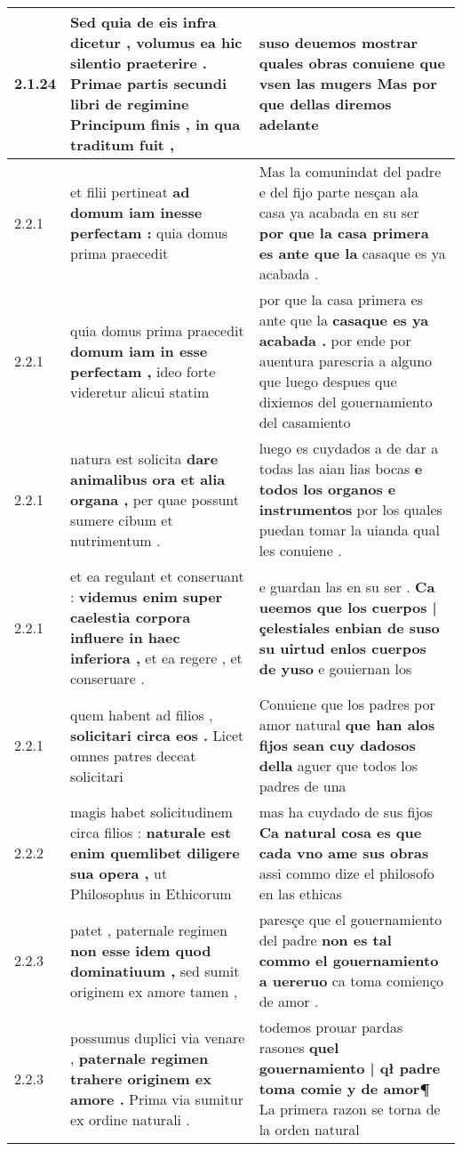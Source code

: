\begin{tabular}{|p{1cm}|p{6.5cm}|p{6.5cm}|}
2.1.24 & Sed quia de eis infra dicetur , \textbf{ volumus ea hic silentio praeterire . Primae partis secundi libri de regimine Principum finis , } in qua traditum fuit , & suso deuemos mostrar \textbf{ quales obras conuiene que vsen las mugers } Mas por que dellas diremos adelante \\\hline
2.2.1 & et filii pertineat \textbf{ ad domum iam inesse perfectam : } quia domus prima praecedit & Mas la comunindat del padre e del fijo parte nesçan ala casa ya acabada en su ser \textbf{ por que la casa primera es ante que la } casaque es ya acabada . \\\hline
2.2.1 & quia domus prima praecedit \textbf{ domum iam in esse perfectam , } ideo forte videretur alicui statim & por que la casa primera es ante que la \textbf{ casaque es ya acabada . } por ende por auentura parescria a alguno que luego despues que dixiemos del gouernamiento del casamiento \\\hline
2.2.1 & natura est solicita \textbf{ dare animalibus ora et alia organa , } per quae possunt sumere cibum et nutrimentum . & luego es cuydados a de dar a todas las aian lias bocas \textbf{ e todos los organos e instrumentos } por los quales puedan tomar la uianda qual les conuiene . \\\hline
2.2.1 & et ea regulant et conseruant : \textbf{ videmus enim super caelestia corpora influere in haec inferiora , } et ea regere , et conseruare . & e guardan las en su ser . \textbf{ Ca ueemos que los cuerpos | çelestiales enbian de suso su uirtud enlos cuerpos de yuso } e gouiernan los \\\hline
2.2.1 & quem habent ad filios , \textbf{ solicitari circa eos . } Licet omnes patres deceat solicitari & Conuiene que los padres por amor natural \textbf{ que han alos fijos sean cuy dadosos della } aguer que todos los padres de una \\\hline
2.2.2 & magis habet solicitudinem circa filios : \textbf{ naturale est enim quemlibet diligere sua opera , } ut Philosophus in Ethicorum & mas ha cuydado de sus fijos \textbf{ Ca natural cosa es que cada vno ame sus obras } assi commo dize el philosofo en las ethicas \\\hline
2.2.3 & patet , paternale regimen \textbf{ non esse idem quod dominatiuum , } sed sumit originem ex amore tamen , & paresçe que el gouernamiento del padre \textbf{ non es tal commo el gouernamiento a uereruo } ca toma comienço de amor . \\\hline
2.2.3 & possumus duplici via venare , \textbf{ paternale regimen trahere originem ex amore . } Prima via sumitur ex ordine naturali . & todemos prouar pardas rasones \textbf{ quel gouernamiento | qł padre toma comie y de amor¶ } La primera razon se torna de la orden natural \\\hline

\end{tabular}
